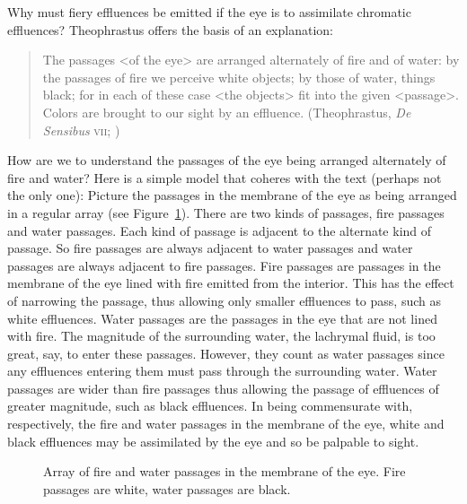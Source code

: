 Why must fiery effluences be emitted if the eye is to assimilate chromatic effluences? Theophrastus offers the basis of an explanation:
\begin{quote}
	The passages <of the eye> are arranged alternately of fire and of water: by the passages of fire we perceive white objects; by those of water, things black; for in each of these case <the objects> fit into the given <passage>. Colors are brought to our sight by an effluence. (Theophrastus, \emph{De Sensibus} \textsc{vii}; \citealt[71--73]{Stratton:1917vn})
\end{quote}
How are we to understand the passages of the eye being arranged alternately of fire and water? Here is a simple model that coheres with the text (perhaps not the only one): Picture the passages in the membrane of the eye as being arranged in a regular array (see Figure~\ref{fig:1}). There are two kinds of passages, fire passages and water passages. Each kind of passage is adjacent to the alternate kind of passage. So fire passages are always adjacent to water passages and water passages are always adjacent to fire passages. Fire passages are passages in the membrane of the eye lined with fire emitted from the interior. This has the effect of narrowing the passage, thus allowing only smaller effluences to pass, such as white effluences. Water passages are the passages in the eye that are not lined with fire. The magnitude of the surrounding water, the lachrymal fluid, is too great, say, to enter these passages. However, they count as water passages since any effluences entering them must pass through the surrounding water. Water passages are wider than fire passages thus allowing the passage of effluences of greater magnitude, such as black effluences. In being commensurate with, respectively, the fire and water passages in the membrane of the eye, white and black effluences may be assimilated by the eye and so be palpable to sight. 

\begin{figure}[ht]
    \begin{center}
    \end{center}
    \caption{Array of fire and water passages in the membrane of the eye. Fire passages are white, water passages are black.}
    \label{fig:1}
\end{figure}

